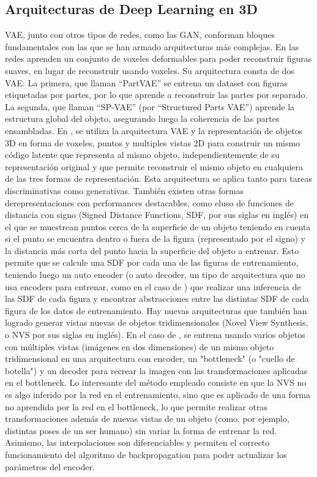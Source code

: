 \documentclass[spanish]{article}
\begin{document}
\subsection{Arquitecturas de Deep Learning en 3D}

VAE, junto con otros tipos de redes, como las GAN, conforman bloques
fundamentales con las que se han armado arquitecturas más complejas.
En \cite{Gao2019} las redes aprenden un conjunto de voxeles deformables
para poder reconstruir figuras suaves, en lugar de reconstruir usando
voxeles. Su arquitectura consta de dos VAE: La primera, que llaman
``PartVAE'' se entrena un dataset con figuras etiquetadas por partes,
por lo que aprende a reconstruir las partes por separado. La segunda,
que llaman ``SP-VAE'' (por ``Structured Parts VAE'') aprende la
estructura global del objeto, asegurando luego la coherencia de las
partes ensambladas. En \cite{Muralikrishnan2019}, se utiliza la
arquitectura VAE y la representación de objetos 3D en forma de voxeles,
puntos y multiples vistas 2D para construir un mismo código latente
que representa al mismo objeto, independientemente de su
representación original y que permite reconstruir el mismo objeto en
cualquiera de las tres formas de representación. Esta arquitectura se
aplica tanto para tareas discriminativas como generativas. También
existen otras formas derepresentaciones con performances destacables,
como eluso de funciones de distancia con signo \cite{Park2019}
(Signed Distance Functions, SDF, por sus siglas en inglés) en el que
se muestrean puntos cerca de la superficie de un objeto teniendo en
cuenta si el punto se encuentra dentro o fuera de la figura
(representado por el signo) y la distancia más corta del punto hacia
la superficie del objeto a entrenar. Esto permite que se calcule una
SDF por cada una de las figuras de entrenamiento, teniendo luego un
auto encoder (o auto decoder, un tipo de arquitectura que no usa
encoders para entrenar, como en el caso de \cite{Park2019}) que
realizar una inferencia de las SDF de cada figura y encontrar
abstracciones entre las distintas SDF de cada figura de los datos de
entrenamiento. Hay nuevas arquitecturas \cite{Olszewski2019} que
también han logrado generar vistas nuevas de objetos tridimensionales
(Novel View Synthesis, o NVS por sus siglas en inglés). En el caso de
\cite{Olszewski2019}, se entrena usando varios objetos con múltiples
vistas (imágenes en dos dimensiones) de un mismo objeto tridimensional
en una arquitectura con encoder, un "bottleneck" (o "cuello de botella")
y un decoder para recrear la imagen con las transformaciones aplicadas
en el bottleneck. Lo interesante del método empleado consiste en que la
NVS no es algo inferido por la red en el entrenamiento, sino que es
aplicado de una forma no aprendida por la red en el bottleneck, lo que
permite realizar otras transformaciones además de nuevas vistas de un
objeto (como, por ejemplo, distintas poses de un ser humano) sin variar
la forma de entrenar la red. Asimismo, las interpolaciones son
diferenciables y permiten el correcto funcionamiento del algoritmo de
backpropagation para poder actualizar los parámetros del encoder.
\end{document}
